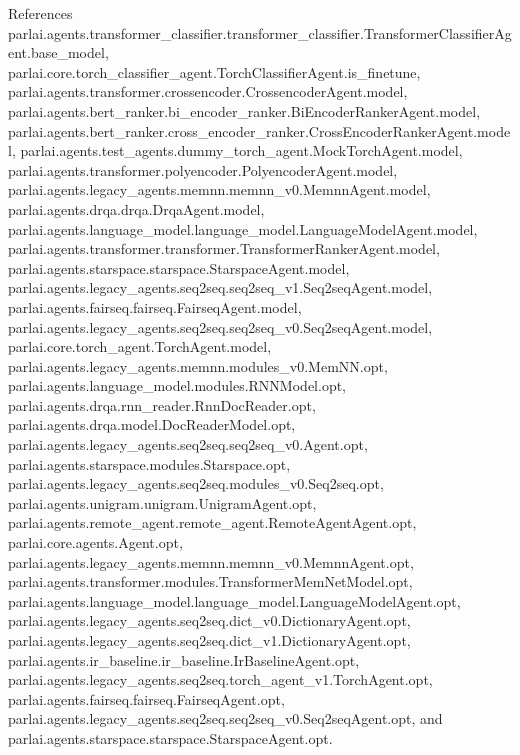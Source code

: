 References parlai.\+agents.\+transformer\+\_\+classifier.\+transformer\+\_\+classifier.\+Transformer\+Classifier\+Agent.\+base\+\_\+model, parlai.\+core.\+torch\+\_\+classifier\+\_\+agent.\+Torch\+Classifier\+Agent.\+is\+\_\+finetune, parlai.\+agents.\+transformer.\+crossencoder.\+Crossencoder\+Agent.\+model, parlai.\+agents.\+bert\+\_\+ranker.\+bi\+\_\+encoder\+\_\+ranker.\+Bi\+Encoder\+Ranker\+Agent.\+model, parlai.\+agents.\+bert\+\_\+ranker.\+cross\+\_\+encoder\+\_\+ranker.\+Cross\+Encoder\+Ranker\+Agent.\+model, parlai.\+agents.\+test\+\_\+agents.\+dummy\+\_\+torch\+\_\+agent.\+Mock\+Torch\+Agent.\+model, parlai.\+agents.\+transformer.\+polyencoder.\+Polyencoder\+Agent.\+model, parlai.\+agents.\+legacy\+\_\+agents.\+memnn.\+memnn\+\_\+v0.\+Memnn\+Agent.\+model, parlai.\+agents.\+drqa.\+drqa.\+Drqa\+Agent.\+model, parlai.\+agents.\+language\+\_\+model.\+language\+\_\+model.\+Language\+Model\+Agent.\+model, parlai.\+agents.\+transformer.\+transformer.\+Transformer\+Ranker\+Agent.\+model, parlai.\+agents.\+starspace.\+starspace.\+Starspace\+Agent.\+model, parlai.\+agents.\+legacy\+\_\+agents.\+seq2seq.\+seq2seq\+\_\+v1.\+Seq2seq\+Agent.\+model, parlai.\+agents.\+fairseq.\+fairseq.\+Fairseq\+Agent.\+model, parlai.\+agents.\+legacy\+\_\+agents.\+seq2seq.\+seq2seq\+\_\+v0.\+Seq2seq\+Agent.\+model, parlai.\+core.\+torch\+\_\+agent.\+Torch\+Agent.\+model, parlai.\+agents.\+legacy\+\_\+agents.\+memnn.\+modules\+\_\+v0.\+Mem\+N\+N.\+opt, parlai.\+agents.\+language\+\_\+model.\+modules.\+R\+N\+N\+Model.\+opt, parlai.\+agents.\+drqa.\+rnn\+\_\+reader.\+Rnn\+Doc\+Reader.\+opt, parlai.\+agents.\+drqa.\+model.\+Doc\+Reader\+Model.\+opt, parlai.\+agents.\+legacy\+\_\+agents.\+seq2seq.\+seq2seq\+\_\+v0.\+Agent.\+opt, parlai.\+agents.\+starspace.\+modules.\+Starspace.\+opt, parlai.\+agents.\+legacy\+\_\+agents.\+seq2seq.\+modules\+\_\+v0.\+Seq2seq.\+opt, parlai.\+agents.\+unigram.\+unigram.\+Unigram\+Agent.\+opt, parlai.\+agents.\+remote\+\_\+agent.\+remote\+\_\+agent.\+Remote\+Agent\+Agent.\+opt, parlai.\+core.\+agents.\+Agent.\+opt, parlai.\+agents.\+legacy\+\_\+agents.\+memnn.\+memnn\+\_\+v0.\+Memnn\+Agent.\+opt, parlai.\+agents.\+transformer.\+modules.\+Transformer\+Mem\+Net\+Model.\+opt, parlai.\+agents.\+language\+\_\+model.\+language\+\_\+model.\+Language\+Model\+Agent.\+opt, parlai.\+agents.\+legacy\+\_\+agents.\+seq2seq.\+dict\+\_\+v0.\+Dictionary\+Agent.\+opt, parlai.\+agents.\+legacy\+\_\+agents.\+seq2seq.\+dict\+\_\+v1.\+Dictionary\+Agent.\+opt, parlai.\+agents.\+ir\+\_\+baseline.\+ir\+\_\+baseline.\+Ir\+Baseline\+Agent.\+opt, parlai.\+agents.\+legacy\+\_\+agents.\+seq2seq.\+torch\+\_\+agent\+\_\+v1.\+Torch\+Agent.\+opt, parlai.\+agents.\+fairseq.\+fairseq.\+Fairseq\+Agent.\+opt, parlai.\+agents.\+legacy\+\_\+agents.\+seq2seq.\+seq2seq\+\_\+v0.\+Seq2seq\+Agent.\+opt, and parlai.\+agents.\+starspace.\+starspace.\+Starspace\+Agent.\+opt.



